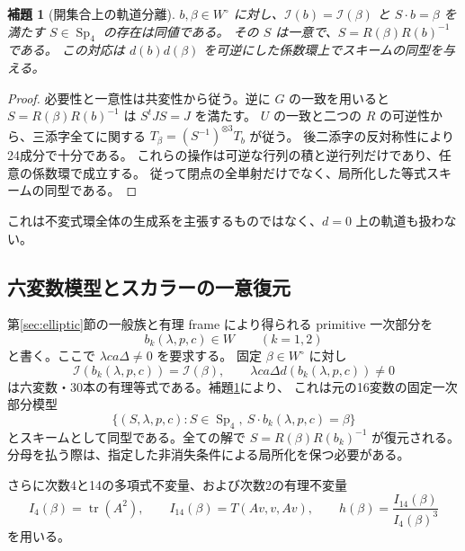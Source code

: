 \documentclass[11pt,a4paper]{ltjsarticle}
\DeclareMathOperator{\Sp}{Sp}
\newtheorem{lemma}[theorem]{補題}
\theoremstyle{remark}
\begin{document}
\begin{lemma}[開集合上の軌道分離]\label{lem:elliptic-separation}
$b,\beta\in W^\circ$ に対し、$\mathcal I(b)=\mathcal I(\beta)$ と
$S\cdot b=\beta$ を満たす $S\in\Sp_4$ の存在は同値である。
その $S$ は一意で、$S=R(\beta)R(b)^{-1}$ である。
この対応は $d(b)d(\beta)$ を可逆にした係数環上でスキームの同型を与える。
\end{lemma}
\begin{proof}
必要性と一意性は共変性から従う。逆に $G$ の一致を用いると
$S=R(\beta)R(b)^{-1}$ は $S^tJS=J$ を満たす。
$U$ の一致と二つの $R$ の可逆性から、三添字全てに関する
$T_\beta=(S^{-1})^{\otimes3}T_b$ が従う。
後二添字の反対称性により24成分で十分である。
これらの操作は可逆な行列の積と逆行列だけであり、任意の係数環で成立する。
従って閉点の全単射だけでなく、局所化した等式スキームの同型である。
\end{proof}

これは不変式環全体の生成系を主張するものではなく、$d=0$ 上の軌道も扱わない。

\subsection{六変数模型とスカラーの一意復元}
第\ref{sec:elliptic}節の一般族と有理 frame により得られる primitive 一次部分を
\[
 b_k(\lambda,p,c)\in W\qquad(k=1,2)
\]
と書く。ここで $\lambda c a\Delta\ne0$ を要求する。
固定 $\beta\in W^\circ$ に対し
\begin{equation}\label{eq:elliptic-six}
 \mathcal I(b_k(\lambda,p,c))=\mathcal I(\beta),\qquad
 \lambda c a\Delta d(b_k(\lambda,p,c))\ne0
\end{equation}
は六変数・30本の有理等式である。補題\ref{lem:elliptic-separation}により、
これは元の16変数の固定一次部分模型
\[
 \{(S,\lambda,p,c):S\in\Sp_4,\ S\cdot b_k(\lambda,p,c)=\beta\}
\]
とスキームとして同型である。全ての解で $S=R(\beta)R(b_k)^{-1}$ が復元される。
分母を払う際は、指定した非消失条件による局所化を保つ必要がある。

さらに次数4と14の多項式不変量、および次数2の有理不変量
\begin{equation}\label{eq:elliptic-scalar-invariants}
 I_4(\beta)=\operatorname{tr}(A^2),\qquad
 I_{14}(\beta)=T(Av,v,Av),\qquad
 h(\beta)=\frac{I_{14}(\beta)}{I_4(\beta)^3}
\end{equation}
を用いる。
\end{document}
